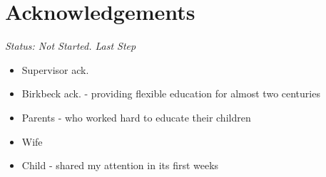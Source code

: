 \chapter*{Acknowledgements}

\emph{Status: Not Started. Last Step}

\begin{itemize}
\item Supervisor ack.
\item Birkbeck ack. - providing flexible education for almost two centuries
\item Parents - who worked hard to educate their children
\item Wife
\item Child - shared my attention in its first weeks
\end{itemize}